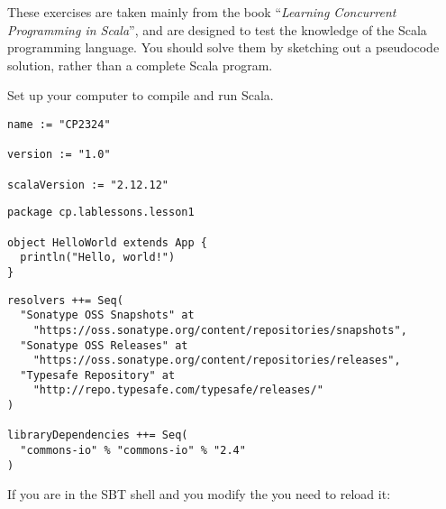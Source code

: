 \documentclass[11pt]{article}
\begin{document}
\myHeader

These exercises are taken mainly from the book ``\emph{Learning Concurrent Programming in Scala}'', and are designed to test the knowledge of the Scala programming language. You should solve them by sketching out a pseudocode solution, rather than a complete Scala program.

\begin{myExercise} Set up your computer to compile and run Scala.
\begin{lstlisting}
name := "CP2324"

version := "1.0"

scalaVersion := "2.12.12"
\end{lstlisting}
\begin{lstlisting}
package cp.lablessons.lesson1

object HelloWorld extends App {
  println("Hello, world!")
}
\end{lstlisting}

\clearpage
{}
\begin{lstlisting}
resolvers ++= Seq(
  "Sonatype OSS Snapshots" at
    "https://oss.sonatype.org/content/repositories/snapshots",
  "Sonatype OSS Releases" at
    "https://oss.sonatype.org/content/repositories/releases",
  "Typesafe Repository" at
    "http://repo.typesafe.com/typesafe/releases/"
)

libraryDependencies ++= Seq(
  "commons-io" % "commons-io" % "2.4"
)
\end{lstlisting}
If you are in the SBT shell and you modify the  you need to reload it:
\\

\end{myExercise}
\end{document}
